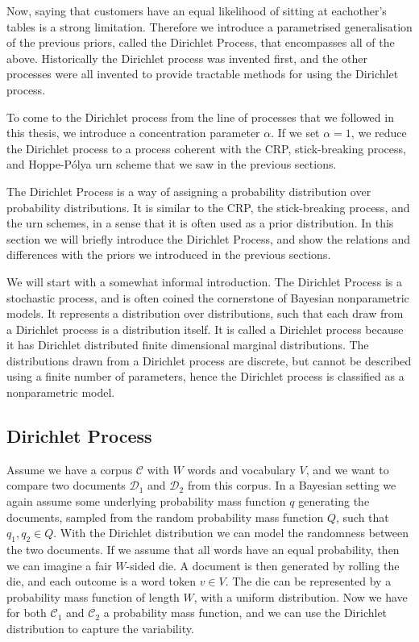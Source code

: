 Now, saying that customers have an equal likelihood of sitting at eachother's tables is a strong limitation. Therefore we introduce a parametrised generalisation of the previous priors, called the Dirichlet Process, that encompasses all of the above. Historically the Dirichlet process was invented first, and the other processes were all invented to provide tractable methods for using the Dirichlet process. 

To come to the Dirichlet process from the line of processes that we followed in this thesis, we introduce a concentration parameter $\alpha $. If we set $\alpha = 1$, we reduce the Dirichlet process to a process coherent with the CRP, stick-breaking process, and Hoppe-P\'olya urn scheme that we saw in the previous sections.  

The Dirichlet Process is a way of assigning a probability distribution over probability distributions. It is similar to the CRP, the stick-breaking process, and the urn schemes, in a sense that it is often used as a prior distribution. In this section we will briefly introduce the Dirichlet Process, and show the relations and differences with the priors we introduced in the previous sections.

We will start with a somewhat informal introduction. The Dirichlet Process is a stochastic process, and is often coined the cornerstone of Bayesian nonparametric models. It represents a distribution over distributions, such that each draw from a Dirichlet process is a distribution itself. It is called a Dirichlet process because it has Dirichlet distributed finite dimensional marginal distributions. The distributions drawn from a Dirichlet process are discrete, but cannot be described using a finite number of parameters, hence the Dirichlet process is classified as a nonparametric model.

\subsection{Dirichlet Process}

Assume we have a corpus $\mathcal{C}$ with $W$ words and vocabulary $V$, and we want to compare two documents $\mathcal{D}_1$ and $\mathcal{D}_2$ from this corpus. In a Bayesian setting we again assume some underlying probability mass function $q$ generating the documents, sampled from the random probability mass function $Q$, such that $q_1,q_2\in Q$. With the Dirichlet distribution we can model the randomness between the two documents. If we assume that all words have an equal probability, then we can imagine a fair $W$-sided die. A document is then generated by rolling the die, and each outcome is a word token $v\in V$. The die can be represented by a probability mass function of length $W$, with a uniform distribution. Now we have for both $\mathcal{C}_1$ and $\mathcal{C}_2$ a probability mass function, and we can use the Dirichlet distribution to capture the variability.

